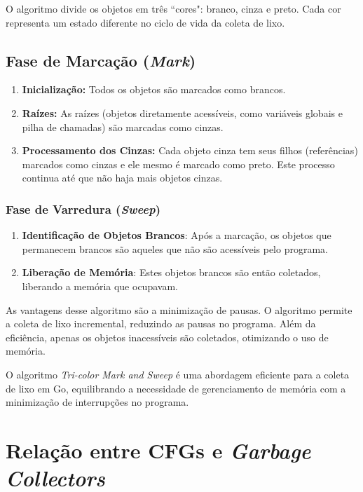 \documentclass{article}
\begin{document}
    O algoritmo divide os objetos em três ``cores": branco, cinza e preto. Cada cor representa um estado diferente
    no ciclo de vida da coleta de lixo.

    \subsection*{Fase de Marcação (\emph{Mark})}

    \begin{enumerate}
        \item \textbf{Inicialização:} Todos os objetos são marcados como brancos.
        \item \textbf{Raízes:} As raízes (objetos diretamente acessíveis, como variáveis globais e pilha de chamadas) são marcadas como cinzas.
        \item \textbf{Processamento dos Cinzas:} Cada objeto cinza tem seus filhos (referências) marcados como cinzas
        e ele mesmo é marcado como preto. Este processo continua até que não haja mais objetos cinzas.
    \end{enumerate}

    \subsubsection*{Fase de Varredura (\emph{Sweep})}
    \begin{enumerate}
        \item \textbf{Identificação de Objetos Brancos}: Após a marcação, os objetos que permanecem brancos
        são aqueles que não são acessíveis pelo programa.
        \item \textbf{Liberação de Memória}: Estes objetos brancos são então coletados, liberando a memória que ocupavam.
    \end{enumerate}

    As vantagens desse algoritmo são a minimização de pausas. O algoritmo permite a coleta de lixo incremental, reduzindo as pausas no programa.
    Além da eficiência, apenas os objetos inacessíveis são coletados, otimizando o uso de memória.

    O algoritmo \textit{Tri-color Mark and Sweep} é uma abordagem eficiente para a coleta de lixo em Go,
    equilibrando a necessidade de gerenciamento de memória com a minimização de interrupções no programa.

    \section*{Relação entre CFGs e \emph{Garbage Collectors}}
\end{document}
